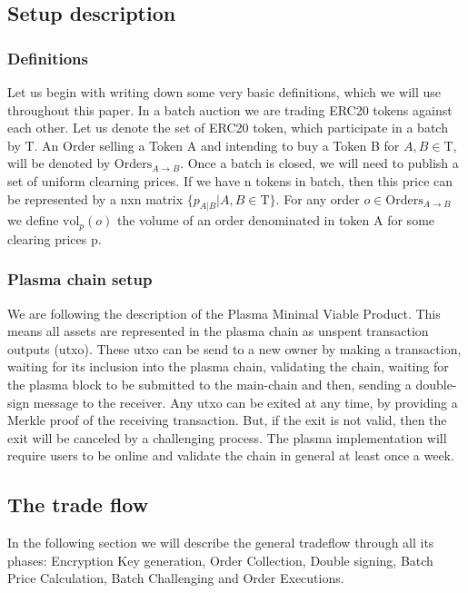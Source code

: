 \documentclass[11pt,parskip=full]{scrartcl}%
\newcommand{\Tau}{\mathrm{T}}
\begin{document}
\subsection{Setup description}

\subsubsection{Definitions}
Let us begin with writing down some very basic definitions, which we will use throughout this paper.
In a batch auction we are trading ERC20 tokens against each other. Let us denote the set of ERC20 token, which participate in a batch by $\Tau$. \newline
An Order selling a Token A and intending to buy a Token B for $A,B\in \Tau$, will be denoted by $\text{Orders}_{A\rightarrow B}$. \newline
Once a batch is closed, we will need to publish a set of uniform clearning prices. If we have n tokens in batch, then this price can be represented by a nxn matrix $\{p_{A|B}| A,B \in \Tau \}$. \newline
For any order $o \in \text{Orders}_{A\rightarrow B}$ we define $\text{vol}_p(o)$ the volume of an order denominated in token A for some clearing prices p.

\subsubsection{Plasma chain setup}
We are following the description of the Plasma Minimal Viable Product\cite{MVP}. This means all assets are represented in the plasma chain as unspent transaction outputs (utxo). These utxo can be send to a new owner by making a transaction, waiting for its inclusion into the plasma chain, validating the chain, waiting for the plasma block to be submitted to the main-chain and then, sending a double-sign message to the receiver.
Any utxo can be exited at any time, by providing a Merkle proof of the receiving transaction. But, if the exit is not valid, then the exit will be canceled by a challenging process.
The plasma implementation will require users to be online and validate the chain in general at least once a week. 




\subsection{The trade flow}
\label{subsec:data}

In the following section we will describe the general tradeflow through all its phases: Encryption Key generation, Order Collection, Double signing, Batch Price Calculation, Batch Challenging and Order Executions.
\end{document}
